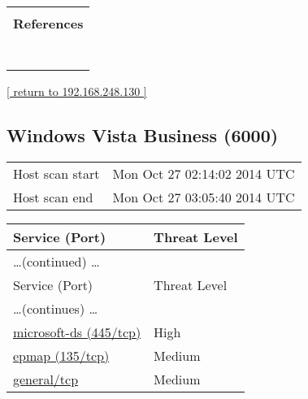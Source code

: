 \documentclass{article}
\begin{document}
\begin{longtable}{|p{}|}
      \hline
      \\
\textbf{References}\\
\rowcolor{white}{\verb=CVE: CVE-2012-0814=}\\
\rowcolor{white}{\verb=BID:51702=}\\
\rowcolor{white}{\verb=Other:=}\\
\rowcolor{white}{\verb=  URL:http://www.securityfocus.com/bid/51702=}\\
\rowcolor{white}{\verb=   URL:http://bugs.debian.org/cgi-bin/bugreport.cgi?bug=\verb-=-\verb=657445=}\\
\rowcolor{white}{\verb=   URL:http://packages.debian.org/squeeze/openssh-server=}\\
\rowcolor{white}{\verb=   URL:https://downloads.avaya.com/css/P8/documents/100161262=}\\
\end{longtable}

\begin{footnotesize}\hyperref[host:192.168.248.130]{[ return to 192.168.248.130 ]}\end{footnotesize}
\subsection{Windows Vista Business (6000)}
\label{host:192.168.248.131}

\begin{tabular}{ll}
Host scan start&Mon Oct 27 02:14:02 2014 UTC\\
Host scan end&Mon Oct 27 03:05:40 2014 UTC\\
\end{tabular}

\begin{longtable}{|l|l|}
\hline
\rowcolor{openvas_report}Service (Port)&Threat Level\\
\hline
\endfirsthead
\multicolumn{2}{l}{\hfill\ldots (continued) \ldots}\\
\hline
\rowcolor{openvas_report}Service (Port)&Threat Level\\
\hline
\endhead
\hline
\multicolumn{2}{l}{\ldots (continues) \ldots}\\
\endfoot
\hline
\endlastfoot
\hline
\hyperref[port:192.168.248.131 microsoft-ds (445/tcp) High]{microsoft-ds (445/tcp)}&High\\
\hline
\hyperref[port:192.168.248.131 epmap (135/tcp) Medium]{epmap (135/tcp)}&Medium\\
\hline
\hyperref[port:192.168.248.131 general/tcp Medium]{general/tcp}&Medium\\
\hline
\end{longtable}
\end{document}
